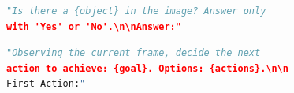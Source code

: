\documentclass[runningheads]{article} %
\begin{document}
\begin{lstlisting}[language=Python, caption={POPE}]
"Is there a {object} in the image? Answer only 
with 'Yes' or 'No'.\n\nAnswer:"
\end{lstlisting}

\begin{lstlisting}[language=Python, caption={ALFWorld-Visual}]
"Observing the current frame, decide the next 
action to achieve: {goal}. Options: {actions}.\n\n
First Action:"
\end{lstlisting}



\end{document}
